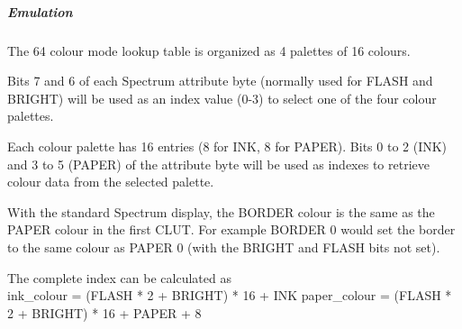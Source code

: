 \subparagraph{Emulation}
The 64 colour mode lookup table is organized as 4 palettes of 16
colours.

Bits 7 and 6 of each Spectrum attribute byte (normally used for FLASH
and BRIGHT) will be used as an index value (0-3) to select one of the
four colour palettes.

Each colour palette has 16 entries (8 for INK, 8 for PAPER). Bits 0 to
2 (INK) and 3 to 5 (PAPER) of the attribute byte will be used as
indexes to retrieve colour data from the selected palette.

With the standard Spectrum display, the BORDER colour is the same as
the PAPER colour in the first CLUT. For example BORDER 0 would set the
border to the same colour as PAPER 0 (with the BRIGHT and FLASH bits
not set).

The complete index can be calculated as\\
ink\_colour = (FLASH * 2 + BRIGHT) * 16 + INK
paper\_colour = (FLASH * 2 + BRIGHT) * 16 + PAPER + 8

